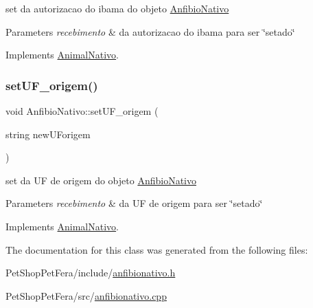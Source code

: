 set da autorizacao do ibama do objeto \mbox{\hyperlink{class_anfibio_nativo}{Anfibio\+Nativo}} 


\begin{DoxyParams}{Parameters}
{\em recebimento} & da autorizacao do ibama para ser \char`\"{}setado\char`\"{} \\
\hline
\end{DoxyParams}


Implements \mbox{\hyperlink{class_animal_nativo_a1af7e01f35c5df788dd898136975eb49}{Animal\+Nativo}}.

\mbox{\label{class_anfibio_nativo_a6c09318140be35947cab0810d21d3af0}} 
\subsubsection{\texorpdfstring{setUF\_origem()}{setUF\_origem()}}
{\footnotesize\ttfamily void Anfibio\+Nativo\+::set\+U\+F\+\_\+origem (\begin{DoxyParamCaption}\item[{string}]{new\+U\+Forigem }\end{DoxyParamCaption})\hspace{0.3cm}{\ttfamily [virtual]}}



set da UF de origem do objeto \mbox{\hyperlink{class_anfibio_nativo}{Anfibio\+Nativo}} 


\begin{DoxyParams}{Parameters}
{\em recebimento} & da UF de origem para ser \char`\"{}setado\char`\"{} \\
\hline
\end{DoxyParams}


Implements \mbox{\hyperlink{class_animal_nativo}{Animal\+Nativo}}.



The documentation for this class was generated from the following files\+:\begin{DoxyCompactItemize}
\item 
Pet\+Shop\+Pet\+Fera/include/\mbox{\hyperlink{anfibionativo_8h}{anfibionativo.\+h}}\item 
Pet\+Shop\+Pet\+Fera/src/\mbox{\hyperlink{anfibionativo_8cpp}{anfibionativo.\+cpp}}\end{DoxyCompactItemize}
